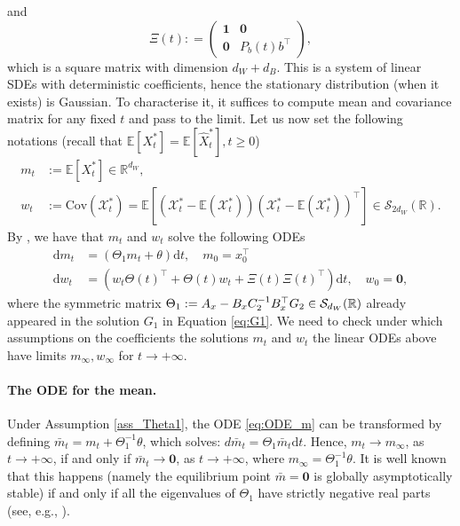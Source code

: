 \documentclass[a4paper,10pt]{article}
\newcommand{\EE}{\mathbb{E}}
\newcommand{\RR}{\mathbb{R}}
\newcommand{\D}{\mathrm{d}}
\newcommand{\Xx}{\mathcal{X}}
\theoremstyle{definition}
\theoremstyle{plain}
\numberwithin{equation}{section}
\begin{document}
    and
    \[ \Xi(t) : =
    \begin{pmatrix}
        \mathbf 1 & \mathbf 0\\
        \mathbf 0 & P_b(t)b^\top 
    \end{pmatrix},
    \]
 which is a square matrix with dimension $d_W + d_B$.
This is a system of linear SDEs with deterministic coefficients, hence the stationary distribution (when it exists) is Gaussian. To characterise it, it suffices to compute mean and covariance matrix for any fixed $t$ and pass to the limit. 
Let us now set the following notations (recall that $\EE[X^*_t] = \EE[\widehat X^*_t], t \ge 0$)
\begin{align}\label{Eq:notations_ODEs}
     m_t & :=   \EE[X^*_t] \in \RR^{d_W}, \\
     w_t & := \textrm{Cov}(\Xx^*_t) = \EE[(\Xx^*_t- \EE(\mathcal X_t^*))(\Xx^*_t-\EE(\mathcal X_t^*))^\top] \in \mathcal S_{2 d_W}(\RR).
\end{align}
By \cite[Chapter 5, Problem 6.1]{karatzas14}, we have that $m_t$ and $w_t$ solve the following ODEs
\begin{align}\label{eq:ODE_m}
    \D m_t & = 
    \left(
   \Theta_1  m_t + \theta
    \right) \D t , \quad m_0 = x_0^\top \\ \label{eq:ODE_w}
    \D w_t & = ( w_t \Theta(t)^\top + \Theta(t) w_t +\Xi(t)\Xi(t)^\top)  \D t ,  \quad w_0 = \mathbf 0,
\end{align}
where the symmetric matrix $\Theta_1 := A_{\rm x} - B_{\rm x} C_2^{-1} B_{\rm x} ^\top G_2 \in \mathcal S_{d_W}(\RR)$ already appeared in the solution $G_1$ in Equation \eqref{eq:G1}.
We need to check under which assumptions on the coefficients the solutions $m_t$ and $w_t$ the linear ODEs above have limits $m_\infty,w_\infty$ for $t \to +\infty$.

\paragraph{The ODE for the mean.}
Under Assumption \ref{ass_Theta1}, the ODE \eqref{eq:ODE_m} can be transformed by defining $\bar m_t= m_t + \Theta_1^{-1} \theta$, which solves: $d\bar m_t= \Theta_1 \bar m_t \D t$.
Hence, $m_t \to m_\infty$, as $t \to +\infty$, if and only if $\bar m_t \to \mathbf 0$, as $t \to +\infty$, where $m_\infty = \Theta_1^{-1} \theta$. It is well known that this happens (namely the equilibrium point $\bar m = \mathbf 0$ is globally asymptotically stable) if and only if all the eigenvalues of $\Theta_1$ have strictly negative real parts (see, e.g., \cite[Theorem 3.5]{Khalil96}).
\end{document}
